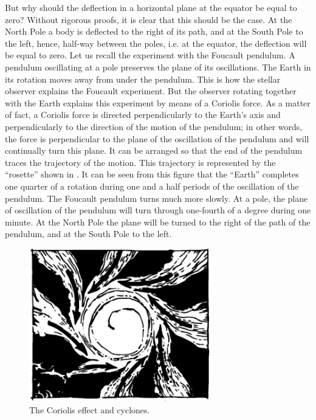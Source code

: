 But why should the deflection in a horizontal plane at
the equator be equal to zero? Without rigorous proofs,
it is clear that this should be the case. At the North
Pole a body is deflected to the right of its path, and at
the South Pole to the left, hence, half-way between the
poles, i.e. at the equator, the deflection will be equal to zero. Let us recall the experiment with the Foucault pendulum. A pendulum oscillating at a pole preserves the plane
of its oscillations. The Earth in its rotation moves away
from under the pendulum. This is how the stellar observer
explains the Foucault experiment. But the observer rotating together with the Earth explains this experiment
by means of a Coriolis force. As a matter of fact, a Coriolis
force is directed perpendicularly to the Earth's axis
and perpendicularly to the direction of the motion of the
pendulum; in other words, the force is perpendicular
to the plane of the oscillation of the pendulum and will
continually turn this plane. It can be arranged so that
the end of the pendulum traces the trajectory of the
motion. This trajectory is represented by the ``rosette''
shown in . It can be seen from this figure
that the ``Earth'' completes one quarter of a rotation
during one and a half periods of the oscillation of the
pendulum. The Foucault pendulum turns much more
slowly. At a pole, the plane of oscillation of the pendulum
will turn through one-fourth of a degree during one
minute. At the North Pole the plane will be turned to
the right of the path of the pendulum, and at the South
Pole to the left.

\begin{figure}[!ht]
\centering
\includegraphics[width=0.7\textwidth]{figures/fig-02-16.pdf}
\caption{The Coriolis effect and cyclones.}
\label{fig-2.16}
\end{figure}

